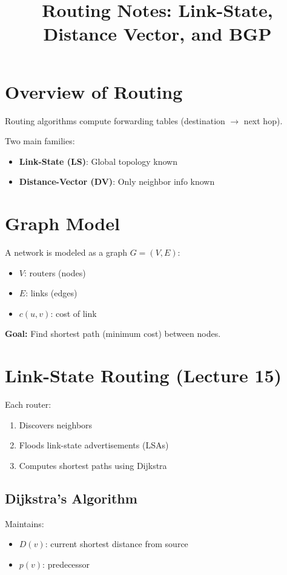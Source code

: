 \documentclass[11pt]{article}
\title{Routing Notes: Link-State, Distance Vector, and BGP}
\author{}
\date{}
\begin{document}
\maketitle

\section{Overview of Routing}
Routing algorithms compute forwarding tables (destination $\rightarrow$ next hop).

Two main families:
\begin{itemize}
    \item \textbf{Link-State (LS)}: Global topology known
    \item \textbf{Distance-Vector (DV)}: Only neighbor info known
\end{itemize}

\section{Graph Model}
A network is modeled as a graph $G = (V, E)$:
\begin{itemize}
    \item $V$: routers (nodes)
    \item $E$: links (edges)
    \item $c(u,v)$: cost of link
\end{itemize}

\textbf{Goal:} Find shortest path (minimum cost) between nodes.

\section{Link-State Routing (Lecture 15)}
Each router:
\begin{enumerate}
    \item Discovers neighbors
    \item Floods link-state advertisements (LSAs)
    \item Computes shortest paths using Dijkstra
\end{enumerate}

\subsection{Dijkstra's Algorithm}
Maintains:
\begin{itemize}
    \item $D(v)$: current shortest distance from source
    \item $p(v)$: predecessor
\end{itemize}
\end{document}
